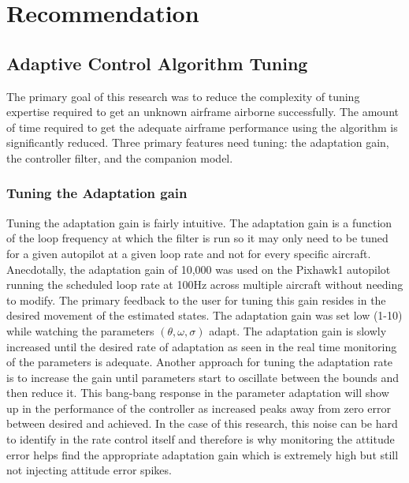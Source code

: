 \chapter{Recommendation}\label{ch:recomendation}

\section{\Lone Adaptive Control Algorithm Tuning}
The primary goal of this research was to reduce the complexity of tuning expertise required to get an unknown airframe airborne successfully.  The amount of time required to get the adequate airframe performance using the \Lone algorithm is significantly reduced.  Three primary features need tuning: the adaptation gain, the controller filter, and the companion model.

\subsection{Tuning the Adaptation gain}
Tuning the adaptation gain is fairly intuitive.  The adaptation gain is a function of the loop frequency at which the filter is run so it may only need to be tuned for a given autopilot at a given loop rate and not for every specific aircraft.  Anecdotally, the adaptation gain of 10,000 was used on the Pixhawk1 autopilot running the scheduled loop rate at 100Hz across multiple aircraft without needing to modify.  The primary feedback to the user for tuning this gain resides in the desired movement of the estimated states.  The adaptation gain was set low (1-10) while watching the parameters $(\theta, \omega, \sigma)$ adapt.  The adaptation gain is slowly increased until the desired rate of adaptation as seen in the real time monitoring of the parameters is adequate.  Another approach for tuning the adaptation rate is to increase the gain until parameters start to oscillate between the bounds and then reduce it.  This bang-bang response in the parameter adaptation will show up in the performance of the controller as increased peaks away from zero error between desired and achieved.  In the case of this research, this noise can be hard to identify in the rate control itself and therefore is why monitoring the attitude error helps find the appropriate adaptation gain which is extremely high but still not injecting attitude error spikes.

